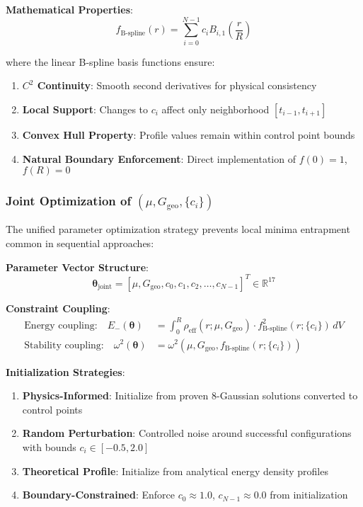 \documentclass[12pt,a4paper]{article}
\begin{document}
\textbf{Mathematical Properties}:
\begin{equation}
f_{\text{B-spline}}(r) = \sum_{i=0}^{N-1} c_i B_{i,1}\left(\frac{r}{R}\right)
\end{equation}

where the linear B-spline basis functions ensure:
\begin{enumerate}
\item \textbf{$C^2$ Continuity}: Smooth second derivatives for physical consistency
\item \textbf{Local Support}: Changes to $c_i$ affect only neighborhood $[t_{i-1}, t_{i+1}]$
\item \textbf{Convex Hull Property}: Profile values remain within control point bounds
\item \textbf{Natural Boundary Enforcement}: Direct implementation of $f(0) = 1$, $f(R) = 0$
\end{enumerate}

\subsubsection{Joint Optimization of $(\mu, G_{\text{geo}}, \{c_i\})$}

The unified parameter optimization strategy prevents local minima entrapment common in sequential approaches:

\textbf{Parameter Vector Structure}:
\begin{equation}
\boldsymbol{\theta}_{\text{joint}} = [\mu, G_{\text{geo}}, c_0, c_1, c_2, \ldots, c_{N-1}]^T \in \mathbb{R}^{17}
\end{equation}

\textbf{Constraint Coupling}:
\begin{align}
\text{Energy coupling:} \quad E_-(\boldsymbol{\theta}) &= \int_0^R \rho_{\text{eff}}(r; \mu, G_{\text{geo}}) \cdot f_{\text{B-spline}}^2(r; \{c_i\}) \, dV \\
\text{Stability coupling:} \quad \omega^2(\boldsymbol{\theta}) &= \omega^2(\mu, G_{\text{geo}}, f_{\text{B-spline}}(r; \{c_i\}))
\end{align}

\textbf{Initialization Strategies}:
\begin{enumerate}
\item \textbf{Physics-Informed}: Initialize from proven 8-Gaussian solutions converted to control points
\item \textbf{Random Perturbation}: Controlled noise around successful configurations with bounds $c_i \in [-0.5, 2.0]$
\item \textbf{Theoretical Profile}: Initialize from analytical energy density profiles
\item \textbf{Boundary-Constrained}: Enforce $c_0 \approx 1.0$, $c_{N-1} \approx 0.0$ from initialization
\end{enumerate}
\end{document}

